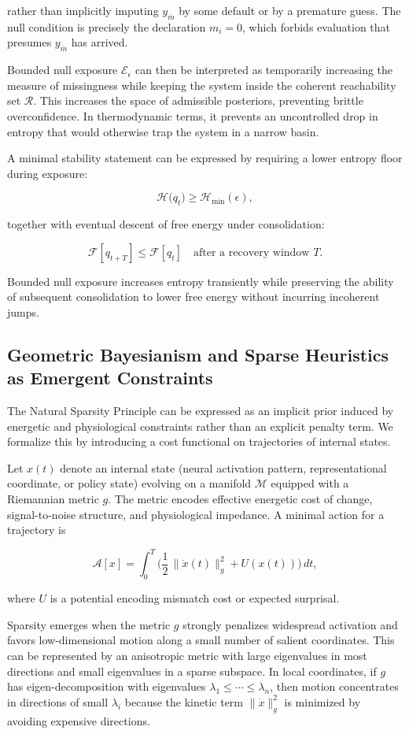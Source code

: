\documentclass[12pt]{article}
\begin{document}
rather than implicitly imputing $y_{\bar m}$ by some default or by a premature guess. The null condition is precisely the declaration $m_i=0$, which forbids evaluation that presumes $y_{\bar m}$ has arrived.

Bounded null exposure $\mathcal{E}_\epsilon$ can then be interpreted as temporarily increasing the measure of missingness while keeping the system inside the coherent reachability set $\mathcal{R}$. This increases the space of admissible posteriors, preventing brittle overconfidence. In thermodynamic terms, it prevents an uncontrolled drop in entropy that would otherwise trap the system in a narrow basin.

A minimal stability statement can be expressed by requiring a lower entropy floor during exposure:

\[
\mathcal{H}\big(q_t\big) \ge \mathcal{H}_{\min}(\epsilon),
\]

together with eventual descent of free energy under consolidation:

\[
\mathcal{F}[q_{t+T}] \le \mathcal{F}[q_t] \quad \text{after a recovery window } T.
\]

Bounded null exposure increases entropy transiently while preserving the ability of subsequent consolidation to lower free energy without incurring incoherent jumps.


\subsection{Geometric Bayesianism and Sparse Heuristics as Emergent Constraints}

The Natural Sparsity Principle can be expressed as an implicit prior induced by energetic and physiological constraints rather than an explicit penalty term. We formalize this by introducing a cost functional on trajectories of internal states.

Let $x(t)$ denote an internal state (neural activation pattern, representational coordinate, or policy state) evolving on a manifold $\mathcal{M}$ equipped with a Riemannian metric $g$. The metric encodes effective energetic cost of change, signal-to-noise structure, and physiological impedance. A minimal action for a trajectory is

\[
\mathcal{A}[x]
=
\int_0^T
\Big(
\frac{1}{2}\,\|\dot{x}(t)\|_{g}^2
+
U(x(t))
\Big)\,dt,
\]

where $U$ is a potential encoding mismatch cost or expected surprisal.

Sparsity emerges when the metric $g$ strongly penalizes widespread activation and favors low-dimensional motion along a small number of salient coordinates. This can be represented by an anisotropic metric with large eigenvalues in most directions and small eigenvalues in a sparse subspace. In local coordinates, if $g$ has eigen-decomposition with eigenvalues $\lambda_1 \le \cdots \le \lambda_n$, then motion concentrates in directions of small $\lambda_i$ because the kinetic term $\|\dot{x}\|_g^2$ is minimized by avoiding expensive directions.
\end{document}

